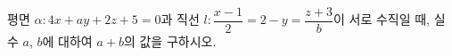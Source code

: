 평면 $\alpha\colon 4x+ay+2z+5=0$과 직선 $l\colon \dfrac{x-1}{2}=2-y=\dfrac{z+3}{b}$이 서로 수직일 때, 실수 $a$, $b$에 대하여 $a+b$의 값을 구하시오.
